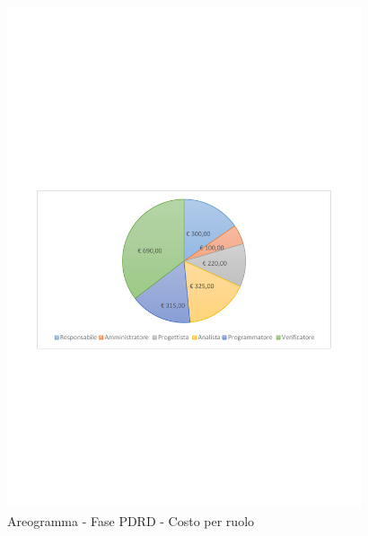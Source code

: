 \documentclass[../PianoProgetto.tex]{subfiles}
\begin{document}
	\begin{figure}[!h]
		\centering
		\includegraphics[width=0.93\textwidth , trim=2cm 9.5cm 2cm 11cm]{grafici/PDRD/PDRD-costo}
			\caption{Areogramma - Fase PDRD - Costo per ruolo}
		\label{fig:CircleChart-fasePDRD_costo_r}
	\end{figure}
\vfill	
\newpage
\vfill
\end{document}
